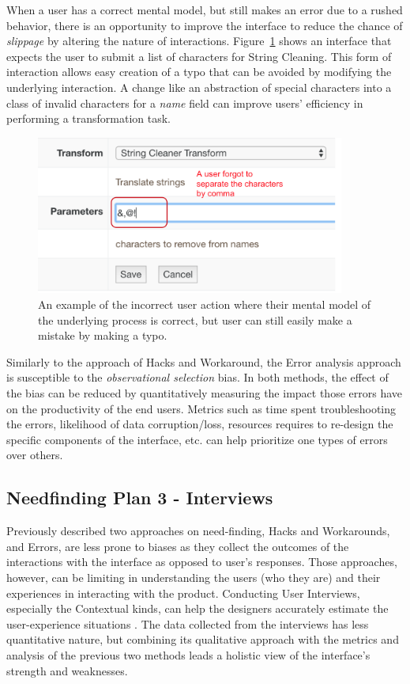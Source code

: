 \documentclass[12pt,letterpaper]{article}
\begin{document}
When a user has a correct mental model, but still makes an error due to a rushed behavior, there is an opportunity to improve the interface to reduce the chance of \textit{slippage} by altering the nature of interactions. Figure~\ref{fig::6} shows an interface that expects the user to submit a list of characters for String Cleaning. This form of interaction allows easy creation of a typo that can be avoided by modifying the underlying interaction. A change like an abstraction of special characters into a class of invalid characters for a \textit{name} field can improve users' efficiency in performing a transformation task.

\begin{figure}[h]
\centering
\includegraphics[width=4in, scale=.3]{slip.png}
\caption{An example of the incorrect user action where their mental model of the underlying process is correct, but user can still easily make a mistake by making a typo.}
\label{fig::6}
\end{figure}

Similarly to the approach of Hacks and Workaround, the Error analysis approach is susceptible to the \textit{observational selection} bias. In both methods, the effect of the bias can be reduced by quantitatively measuring the impact those errors have on the productivity of the end users. Metrics such as time spent troubleshooting the errors, likelihood of data corruption/loss, resources requires to re-design the specific components of the interface, etc. can help prioritize one types of errors over others.  

\subsection*{Needfinding Plan 3 - Interviews}
Previously described two approaches on need-finding, Hacks and Workarounds, and Errors, are less prone to biases as they collect the outcomes of the interactions with the interface as opposed to user's responses. Those approaches, however, can be limiting in understanding the users (who they are) and their experiences in interacting with the product. Conducting User Interviews, especially the Contextual kinds, can help the designers accurately estimate the user-experience situations \cite{basics_ux_design}. The data collected from the interviews has less quantitative nature, but combining its qualitative approach with the metrics and analysis of the previous two methods leads a holistic view of the interface's strength and weaknesses.   
\end{document}
